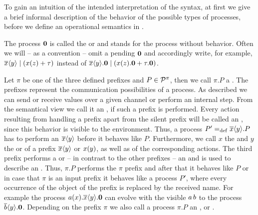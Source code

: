 To gain an intuition of the intended interpretation of the syntax, at first we give a brief informal description of the behavior of the possible types of processes, before we define an operational semantics in .

The process $\mathbf{0}$ is called the  or  and stands for the process without behavior. Often we will -- as a convention -- omit a pending $\mathbf{0}$ and accordingly write, for example, $\overline{x}\langle y\rangle \mid \left(x(z) + \tau\right)$ instead of $\overline{x}\langle y\rangle.\mathbf{0} \mid \left(x(z).\mathbf{0} + \tau.\mathbf{0}\right)$.

Let $\pi$ be one of the three defined prefixes and $P\in\mathcal P^{\pi}$, then we call $\pi.P$ a . The prefixes represent the communication possibilities of a process. As described we can send or receive values over a given channel or perform an internal step. From the semantical view we call it an , if such a prefix is performed. Every action resulting from handling a prefix apart from the silent prefix will be called an , since this behavior is visible to the environment. Thus, a process $P'=_{\mathrm{def}}\overline{x}\langle y\rangle.P$ has to perform an  $\overline{x}\langle y\rangle$ before it behaves like $P$. Furthermore, we call $x$ the  and $y$ the  or  of a prefix $\overline{x}\langle y\rangle$ or $x(y)$, as well as of the corresponding actions. The third prefix performs a  or -- in contrast to the other prefixes -- an  and is used to describe an . Thus, $\pi.P$ performs the $\pi$ prefix and after that it behaves like $P$ or in case that $\pi$ is an input prefix it behaves like a process $P'$, where every occurrence of the object of the prefix is replaced by the received name. For example the process $a(x).\overline{x}\langle y\rangle.\mathbf{0}$ can evolve with the visible  $a\,b$ to the process $\overline{b}\langle y\rangle.\mathbf{0}$. Depending on the prefix $\pi$ we also call a process $\pi.P$ an ,  or .

